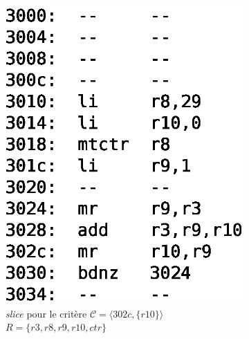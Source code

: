     \begin{figure}[ht]
      \centering
      \begin{subfigure}{.45\textwidth}
        \centering
        \captionsetup{justification=centering}
        \includegraphics[scale=0.45]{img/slice1.eps}
        \caption{\emph{slice} pour le critère $\mathcal{C} = \langle 302c, \{ r10 \} \rangle$ \\
          $R = \{r3, r8, r9, r10, ctr\}$}
        \label{fig:slice1}
      \end{subfigure}
      \begin{subfigure}{.45\textwidth}
        \centering
        \captionsetup{justification=centering}

\end{subfigure}
\end{figure}
